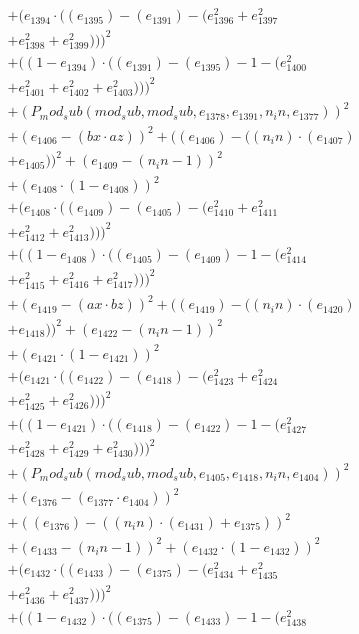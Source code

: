 \documentclass[10pt, a4paper]{article}
\begin{document}
\begin{small}
\begin{align*}
& + (e_{1394}  \cdot  ((e_{1395}) - (e_{1391}) - (e_{1396}^{2} + e_{1397}^{2} \\
& + e_{1398}^{2} + e_{1399}^{2})))^{2} \\
& + ((1 - e_{1394})  \cdot  ((e_{1391}) - (e_{1395}) - 1 - (e_{1400}^{2} \\
& + e_{1401}^{2} + e_{1402}^{2} + e_{1403}^{2})))^{2} \\
& + (P_mod_sub(mod_sub, mod_sub, e_{1378}, e_{1391}, n_in, e_{1377}))^{2} \\
& + (e_{1406} - (bx  \cdot  az))^{2} + ((e_{1406}) - ((n_in)  \cdot  (e_{1407}) \\
& + e_{1405}))^{2} + (e_{1409} - (n_in - 1))^{2} \\
& + (e_{1408}  \cdot  (1 - e_{1408}))^{2} \\
& + (e_{1408}  \cdot  ((e_{1409}) - (e_{1405}) - (e_{1410}^{2} + e_{1411}^{2} \\
& + e_{1412}^{2} + e_{1413}^{2})))^{2} \\
& + ((1 - e_{1408})  \cdot  ((e_{1405}) - (e_{1409}) - 1 - (e_{1414}^{2} \\
& + e_{1415}^{2} + e_{1416}^{2} + e_{1417}^{2})))^{2} \\
& + (e_{1419} - (ax  \cdot  bz))^{2} + ((e_{1419}) - ((n_in)  \cdot  (e_{1420}) \\
& + e_{1418}))^{2} + (e_{1422} - (n_in - 1))^{2} \\
& + (e_{1421}  \cdot  (1 - e_{1421}))^{2} \\
& + (e_{1421}  \cdot  ((e_{1422}) - (e_{1418}) - (e_{1423}^{2} + e_{1424}^{2} \\
& + e_{1425}^{2} + e_{1426}^{2})))^{2} \\
& + ((1 - e_{1421})  \cdot  ((e_{1418}) - (e_{1422}) - 1 - (e_{1427}^{2} \\
& + e_{1428}^{2} + e_{1429}^{2} + e_{1430}^{2})))^{2} \\
& + (P_mod_sub(mod_sub, mod_sub, e_{1405}, e_{1418}, n_in, e_{1404}))^{2} \\
& + (e_{1376} - (e_{1377}  \cdot  e_{1404}))^{2} \\
& + ((e_{1376}) - ((n_in)  \cdot  (e_{1431}) + e_{1375}))^{2} \\
& + (e_{1433} - (n_in - 1))^{2} + (e_{1432}  \cdot  (1 - e_{1432}))^{2} \\
& + (e_{1432}  \cdot  ((e_{1433}) - (e_{1375}) - (e_{1434}^{2} + e_{1435}^{2} \\
& + e_{1436}^{2} + e_{1437}^{2})))^{2} \\
& + ((1 - e_{1432})  \cdot  ((e_{1375}) - (e_{1433}) - 1 - (e_{1438}^{2} \\

\end{align*}
\end{small}
\end{document}
